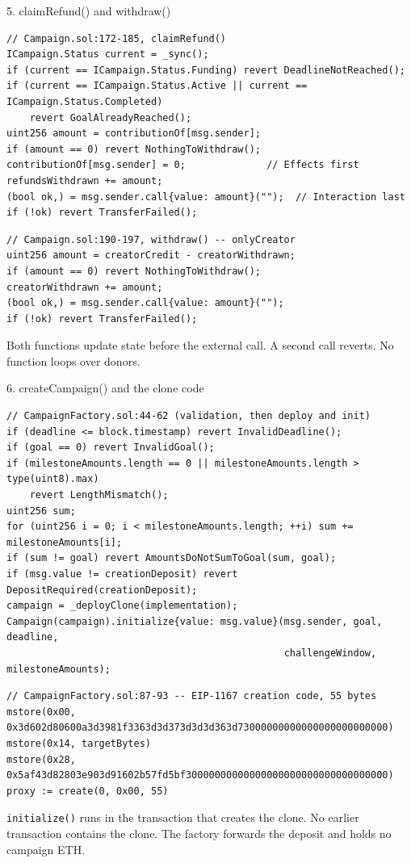\documentclass[aspectratio=169,10pt]{beamer}
\begin{document}
\begin{frame}[fragile]{5. claimRefund() and withdraw()}
\scriptsize
\begin{verbatim}
// Campaign.sol:172-185, claimRefund()
ICampaign.Status current = _sync();
if (current == ICampaign.Status.Funding) revert DeadlineNotReached();
if (current == ICampaign.Status.Active || current == ICampaign.Status.Completed)
    revert GoalAlreadyReached();
uint256 amount = contributionOf[msg.sender];
if (amount == 0) revert NothingToWithdraw();
contributionOf[msg.sender] = 0;              // Effects first
refundsWithdrawn += amount;
(bool ok,) = msg.sender.call{value: amount}("");  // Interaction last
if (!ok) revert TransferFailed();
\end{verbatim}
\vspace{0.25em}
\begin{verbatim}
// Campaign.sol:190-197, withdraw() -- onlyCreator
uint256 amount = creatorCredit - creatorWithdrawn;
if (amount == 0) revert NothingToWithdraw();
creatorWithdrawn += amount;
(bool ok,) = msg.sender.call{value: amount}("");
if (!ok) revert TransferFailed();
\end{verbatim}
\vspace{0.3em}
\small Both functions update state before the external call. A second call reverts. No function loops over donors.
\end{frame}

\begin{frame}[fragile]{6. createCampaign() and the clone code}
\scriptsize
\begin{verbatim}
// CampaignFactory.sol:44-62 (validation, then deploy and init)
if (deadline <= block.timestamp) revert InvalidDeadline();
if (goal == 0) revert InvalidGoal();
if (milestoneAmounts.length == 0 || milestoneAmounts.length > type(uint8).max)
    revert LengthMismatch();
uint256 sum;
for (uint256 i = 0; i < milestoneAmounts.length; ++i) sum += milestoneAmounts[i];
if (sum != goal) revert AmountsDoNotSumToGoal(sum, goal);
if (msg.value != creationDeposit) revert DepositRequired(creationDeposit);
campaign = _deployClone(implementation);
Campaign(campaign).initialize{value: msg.value}(msg.sender, goal, deadline,
                                                challengeWindow, milestoneAmounts);
\end{verbatim}
\vspace{0.25em}
\begin{verbatim}
// CampaignFactory.sol:87-93 -- EIP-1167 creation code, 55 bytes
mstore(0x00, 0x3d602d80600a3d3981f3363d3d373d3d3d363d73000000000000000000000000)
mstore(0x14, targetBytes)
mstore(0x28, 0x5af43d82803e903d91602b57fd5bf30000000000000000000000000000000000)
proxy := create(0, 0x00, 55)
\end{verbatim}
\vspace{0.2em}
\small \texttt{initialize()} runs in the transaction that creates the clone. No earlier transaction contains the clone.
The factory forwards the deposit and holds no campaign ETH.
\end{frame}
\end{document}
